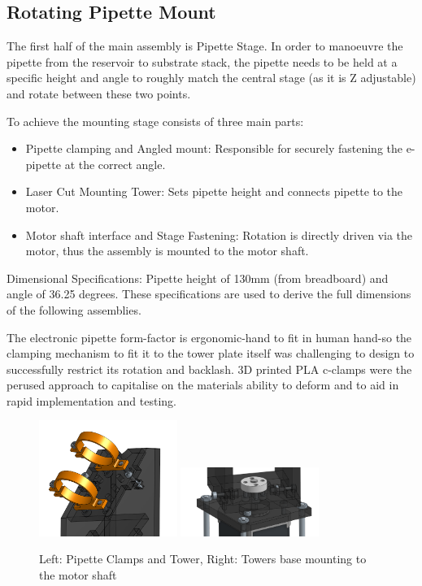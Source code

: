 \subsection{Rotating Pipette Mount}

The first half of the main assembly is Pipette Stage. In order to manoeuvre the pipette from the reservoir to substrate stack, the pipette needs to be held at a specific height and angle to roughly match the central stage (as it is Z adjustable) and rotate between these two points.

To achieve the mounting stage consists of three main parts: 
\begin{itemize}
    \item Pipette clamping and Angled mount: Responsible for securely fastening the e-pipette at the correct angle.
    \item Laser Cut Mounting Tower: Sets pipette height and connects pipette to the motor.
    \item Motor shaft interface and Stage Fastening: Rotation is directly driven via the motor, thus the assembly is mounted to the motor shaft. 
\end{itemize}

Dimensional Specifications: Pipette height of 130mm (from breadboard) and angle of 36.25 degrees.
These specifications are used to derive the full dimensions of the following assemblies.

The electronic pipette form-factor is ergonomic-hand to fit in human hand-so the clamping mechanism to fit it to the tower plate itself was challenging to design to successfully restrict its rotation and backlash. 3D printed PLA c-clamps were the perused approach to capitalise on the materials ability to deform and to aid in rapid implementation and testing.

\begin{figure}[h]
    \centering
    \includegraphics[width=0.4\textwidth]{img/pip_clamp.png}
    \includegraphics[width=0.4\textwidth]{img/tower_mount.png}
    \caption{Left: Pipette Clamps and Tower, Right: Towers base mounting to the motor shaft}
    \label{fig:tower}
\end{figure}

